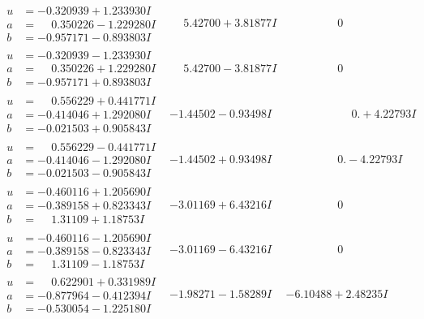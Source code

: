 \documentclass[1p]{elsarticle_modified}
\theoremstyle{definition}
\begin{document}
$$\begin{array}{c|c|c}
\begin{aligned}
u &= -0.320939 + 1.233930 I \\
a &= \phantom{-}0.350226 - 1.229280 I \\
b &= -0.957171 - 0.893803 I\end{aligned}
 & \phantom{-}5.42700 + 3.81877 I & \phantom{-0.000000 } 0 \\ \hline\begin{aligned}
u &= -0.320939 - 1.233930 I \\
a &= \phantom{-}0.350226 + 1.229280 I \\
b &= -0.957171 + 0.893803 I\end{aligned}
 & \phantom{-}5.42700 - 3.81877 I & \phantom{-0.000000 } 0 \\ \hline\begin{aligned}
u &= \phantom{-}0.556229 + 0.441771 I \\
a &= -0.414046 + 1.292080 I \\
b &= -0.021503 + 0.905843 I\end{aligned}
 & -1.44502 - 0.93498 I & \phantom{-0.000000 -}0. + 4.22793 I \\ \hline\begin{aligned}
u &= \phantom{-}0.556229 - 0.441771 I \\
a &= -0.414046 - 1.292080 I \\
b &= -0.021503 - 0.905843 I\end{aligned}
 & -1.44502 + 0.93498 I & \phantom{-0.000000 } 0. - 4.22793 I \\ \hline\begin{aligned}
u &= -0.460116 + 1.205690 I \\
a &= -0.389158 + 0.823343 I \\
b &= \phantom{-}1.31109 + 1.18753 I\end{aligned}
 & -3.01169 + 6.43216 I & \phantom{-0.000000 } 0 \\ \hline\begin{aligned}
u &= -0.460116 - 1.205690 I \\
a &= -0.389158 - 0.823343 I \\
b &= \phantom{-}1.31109 - 1.18753 I\end{aligned}
 & -3.01169 - 6.43216 I & \phantom{-0.000000 } 0 \\ \hline\begin{aligned}
u &= \phantom{-}0.622901 + 0.331989 I \\
a &= -0.877964 - 0.412394 I \\
b &= -0.530054 - 1.225180 I\end{aligned}
 & -1.98271 - 1.58289 I & -6.10488 + 2.48235 I \\ \hline\begin{aligned}

\end{aligned}
\end{array}$$
\end{document}
